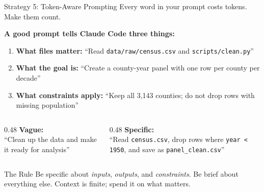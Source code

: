 \documentclass[aspectratio=169, 11pt]{beamer}
\begin{document}
\begin{frame}{Strategy 5: Token-Aware Prompting}
  Every word in your prompt costs tokens. Make them count.

  \vspace{0.5em}
  \textbf{A good prompt tells Claude Code three things:}
  \begin{enumerate}
    \item \textbf{What files matter:} ``Read \texttt{data/raw/census.csv} and \texttt{scripts/clean.py}''
    \item \textbf{What the goal is:} ``Create a county-year panel with one row per county per decade''
    \item \textbf{What constraints apply:} ``Keep all 3,143 counties; do not drop rows with missing population''
  \end{enumerate}

  \vspace{0.5em}
  \begin{columns}[T]
    \begin{column}{0.48\textwidth}
      \textbf{\color{red!70!black} Vague:}\\
      {\small ``Clean up the data and make it ready for analysis''}
    \end{column}
    \begin{column}{0.48\textwidth}
      \textbf{\color{green!50!black} Specific:}\\
      {\small ``Read \texttt{census.csv}, drop rows where \texttt{year < 1950}, and save as \texttt{panel\_clean.csv}''}
    \end{column}
  \end{columns}

  \vspace{0.8em}
  \begin{block}{The Rule}
    Be specific about \textit{inputs}, \textit{outputs}, and \textit{constraints}. Be brief about everything else. Context is finite; spend it on what matters.
  \end{block}
\end{frame}
\end{document}
